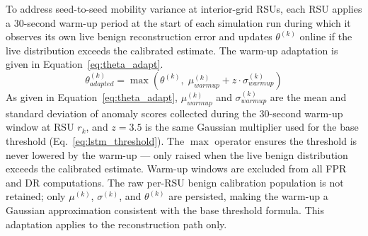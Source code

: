 \documentclass[12pt, a4paper]{report}
\begin{document}
To address seed-to-seed mobility variance at
interior-grid \ac{RSU}s, each \ac{RSU} applies a
30-second warm-up period at the start of each
simulation run during which it observes its own
live benign reconstruction error and updates
$\theta^{(k)}$ online if the live distribution
exceeds the calibrated estimate. The warm-up
adaptation is given in
Equation~\eqref{eq:theta_adapt}.
\begin{equation}
\theta^{(k)}_{adapted} =
\max\!\left(
\theta^{(k)},\;
\mu_{warmup}^{(k)} + z \cdot \sigma_{warmup}^{(k)}
\right)
\label{eq:theta_adapt}
\end{equation}
As given in Equation~\eqref{eq:theta_adapt},
$\mu_{warmup}^{(k)}$ and $\sigma_{warmup}^{(k)}$
are the mean and standard deviation of anomaly
scores collected during the 30-second warm-up
window at \ac{RSU} $r_k$, and $z = 3.5$ is the
same Gaussian multiplier used for the base
threshold (Eq.~\ref{eq:lstm_threshold}). The
$\max$ operator ensures the threshold is never
lowered by the warm-up — only raised when the
live benign distribution exceeds the calibrated
estimate. Warm-up windows are excluded from all
\ac{FPR} and \ac{DR} computations.
The raw per-RSU benign calibration population
is not retained; only $\mu^{(k)}$, $\sigma^{(k)}$,
and $\theta^{(k)}$ are persisted, making the
warm-up a Gaussian approximation consistent with
the base threshold formula. This adaptation applies to the
reconstruction path only.
\end{document}
